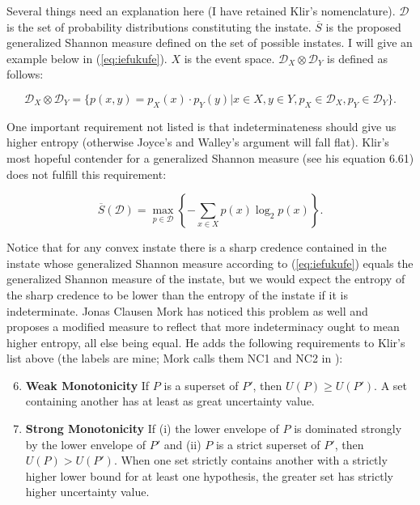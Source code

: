 \documentclass[phd,12pt,oneside]{ubcthesis}
\begin{document}
Several things need an explanation here (I have retained Klir's
nomenclature). $\mathcal{D}$ is the set of probability distributions
constituting the instate. $\overline{S}$ is the proposed generalized
Shannon measure defined on the set of possible instates. I will give
an example below in (\ref{eq:iefukufe}). $X$ is the event space.
$\mathcal{D}_{X}\otimes\mathcal{D}_{Y}$ is defined as follows:

\begin{equation}
  \label{eq:xoofahee}
\mathcal{D}_{X}\otimes\mathcal{D}_{Y}=\{p(x,y)=p_{X}(x)\cdot{}p_{Y}(y)|x\in{}X,y\in{}Y,p_{X}\in\mathcal{D}_{X},p_{Y}\in\mathcal{D}_{Y}\}.
\end{equation}

One important requirement not listed is that indeterminateness should
give us higher entropy (otherwise Joyce's and Walley's argument will
fall flat). Klir's most hopeful contender for a generalized Shannon
measure (see his equation 6.61) does not fulfill this requirement:

\begin{equation}
  \label{eq:iefukufe}
\overline{S}(\mathcal{D})=\max_{p\in\mathcal{D}}\left\{-\sum_{x\in{}X}p(x)\log_{2}p(x)\right\}.
\end{equation}

Notice that for any convex instate there is a sharp credence contained
in the instate whose generalized Shannon measure according to
(\ref{eq:iefukufe}) equals the generalized Shannon measure of the
instate, but we would expect the entropy of the sharp credence to be
lower than the entropy of the instate if it is indeterminate. Jonas
Clausen Mork has noticed this problem as well and proposes a modified
measure to reflect that more indeterminacy ought to mean higher
entropy, all else being equal. He adds the following requirements to
Klir's list above (the labels are mine; Mork calls them NC1 and NC2 in
):

\begin{enumerate}[(S1)]
\setcounter{enumi}{5}
\item \textbf{Weak Monotonicity} If $P$ is a superset of $P'$, then
  $U(P)\geq{}U(P')$. A set containing another has at least as great
  uncertainty value.
\item \textbf{Strong Monotonicity} If (i) the lower envelope of $P$ is
  dominated strongly by the lower envelope of $P'$ and (ii) $P$ is a
  strict superset of $P'$, then $U(P)>U(P')$. When one set strictly
  contains another with a strictly higher lower bound for at least one
  hypothesis, the greater set has strictly higher uncertainty value.
\end{enumerate}
\end{document}
